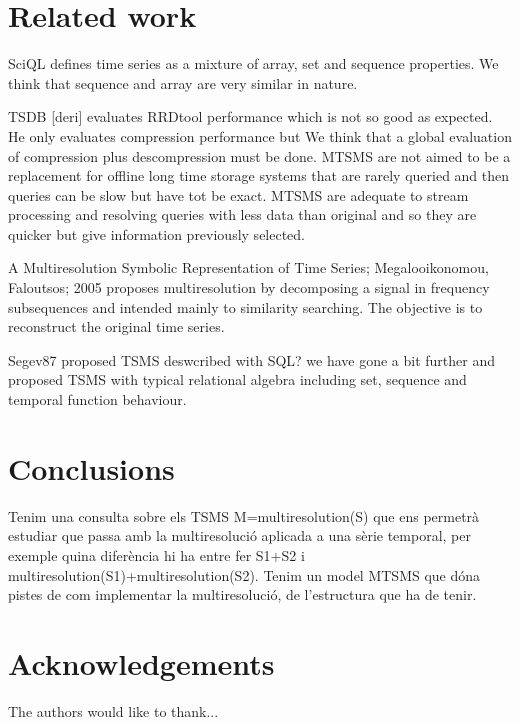 

\section{Related work}

\todo{}


SciQL defines time series as a mixture of array, set and sequence properties. We think that sequence and array are very similar in nature. 



TSDB [deri] evaluates RRDtool performance which is not so good as expected. He only evaluates compression performance but We think that a global evaluation of compression plus descompression must be done. MTSMS are not aimed to be a replacement for offline long time storage systems that are rarely queried and then queries can be slow but have tot be exact. MTSMS are adequate to stream processing and resolving queries with less data than original and so they are quicker but give information previously selected.



A Multiresolution Symbolic Representation of
Time Series; Megalooikonomou, Faloutsos; 2005 proposes multiresolution by decomposing a signal in frequency subsequences and intended mainly to similarity searching. The objective is to reconstruct the original time series. 
 

Segev87 proposed TSMS deswcribed with SQL? we have gone a bit further and proposed TSMS with typical relational algebra including set, sequence and temporal function behaviour. 






\section{Conclusions}

\todo{}

Tenim una consulta sobre els TSMS M=multiresolution(S) que ens permetrà estudiar que passa amb la multiresolució aplicada a una sèrie temporal, per exemple quina diferència hi ha entre fer S1+S2 i multiresolution(S1)+multiresolution(S2).
Tenim un model MTSMS que dóna pistes de com implementar la multiresolució, de l'estructura que ha de tenir.



\section{Acknowledgements}

\todo{}

The authors would like to thank...









